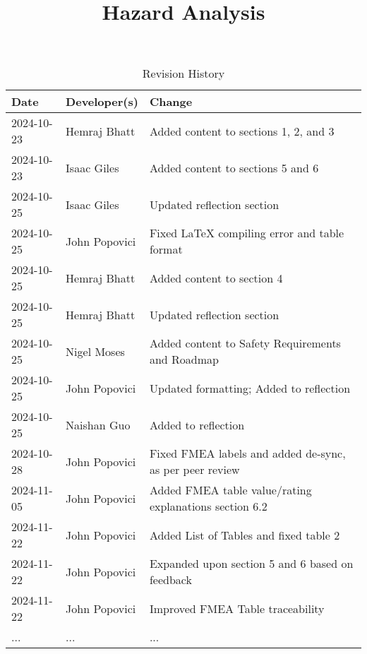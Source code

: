 \documentclass{article}
\title{Hazard Analysis\\\progname}
\author{\authname}
\date{}
\begin{document}
\maketitle
\thispagestyle{empty}



\begin{table}[hp]
\caption{Revision History} \label{TblRevisionHistory}
\begin{tabularx}{\textwidth}{llX}
\toprule
\textbf{Date} & \textbf{Developer(s)} & \textbf{Change}\\
\midrule
2024-10-23 & Hemraj Bhatt & Added content to sections 1, 2, and 3\\
2024-10-23 & Isaac Giles & Added content to sections 5 and 6 \\
2024-10-25 & Isaac Giles & Updated reflection section \\
2024-10-25 & John Popovici & Fixed LaTeX compiling error and table format \\
2024-10-25 & Hemraj Bhatt & Added content to section 4\\
2024-10-25 & Hemraj Bhatt & Updated reflection section\\
2024-10-25 & Nigel Moses & Added content to Safety Requirements and Roadmap\\
2024-10-25 & John Popovici & Updated formatting; Added to reflection \\
2024-10-25 & Naishan Guo &  Added to reflection \\
2024-10-28 & John Popovici & Fixed FMEA labels and added de-sync, as per peer review \\
2024-11-05 & John Popovici & Added FMEA table value/rating explanations section 6.2\\
2024-11-22 & John Popovici & Added List of Tables and fixed table 2\\
2024-11-22 & John Popovici & Expanded upon section 5 and 6 based on feedback\\
2024-11-22 & John Popovici & Improved FMEA Table traceability\\
... & ... & ...\\
\bottomrule
\end{tabularx}
\end{table}

~\newpage

\tableofcontents

\listoftables

~\newpage
\end{document}
